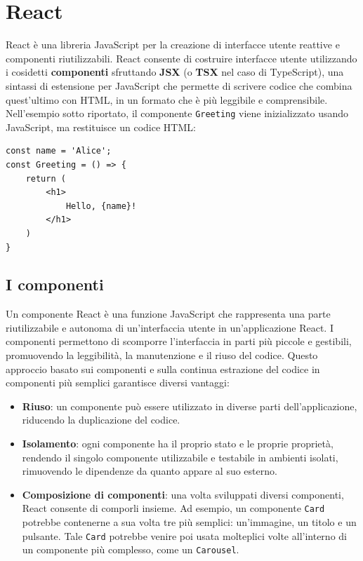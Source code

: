 \documentclass[target=bach,aauheader=,style=]{thud}
\begin{document}
\section{React}
React è una libreria JavaScript per la creazione di interfacce utente reattive e componenti riutilizzabili. React consente di costruire interfacce utente utilizzando i cosidetti \textbf{componenti} sfruttando \textbf{JSX} (o \textbf{TSX} nel caso di TypeScript), una sintassi di estensione per JavaScript che permette di scrivere codice che combina quest'ultimo con HTML, in un formato che è più leggibile e comprensibile. Nell'esempio sotto riportato, il componente \texttt{Greeting} viene inizializzato usando JavaScript, ma restituisce un codice HTML:

\begin{lstlisting}[language=React, caption=Esempio di codice React]
const name = 'Alice';   
const Greeting = () => {
    return (
        <h1>
            Hello, {name}!
        </h1>
    )
} 
\end{lstlisting}

\subsection{I componenti}
Un componente React è una funzione JavaScript che rappresenta una parte riutilizzabile e autonoma di un'interfaccia utente in un'applicazione React. I componenti permettono di scomporre l'interfaccia in parti più piccole e gestibili, promuovendo la leggibilità, la manutenzione e il riuso del codice. Questo approccio basato sui componenti e sulla continua estrazione del codice in componenti più semplici garantisce diversi vantaggi:

\begin{itemize}
    \item \textbf{Riuso}: un componente può essere utilizzato in diverse parti dell'applicazione, riducendo la duplicazione del codice.
    \item \textbf{Isolamento}: ogni componente ha il proprio stato e le proprie proprietà, rendendo il singolo componente utilizzabile e testabile in ambienti isolati, rimuovendo le dipendenze da quanto appare al suo esterno.
    \item \textbf{Composizione di componenti}: una volta sviluppati diversi componenti, React consente di comporli insieme. Ad esempio, un componente \texttt{Card} potrebbe contenerne a sua volta tre più semplici: un'immagine, un titolo e un pulsante. Tale \texttt{Card} potrebbe venire poi usata molteplici volte all'interno di un componente più complesso, come un \texttt{Carousel}.
\end{itemize}
\end{document}
